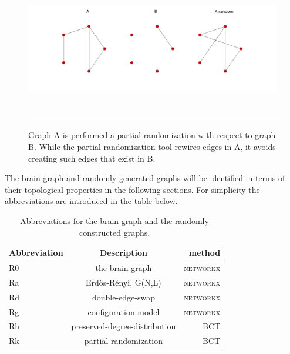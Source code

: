 \begin{figure}[htbp]
  \centering
	\includegraphics[width=\textwidth, height=55mm]{Figures/p1.png}  
    \rule{35em}{0.5pt}
    \caption[Partial Randomization Example]{Graph A is performed a partial randomization with respect to graph B. While the partial randomization tool rewires edges in A, it avoids creating such edges that exist in B.}
  \label{fig:Partial Randomization Example}
\end{figure}

The brain graph and randomly generated graphs will be identified in terms of their topological properties in the following sections. For simplicity the abbreviations are introduced in the table below. 

\begin{table}[h]
\begin{center}
\caption[Abbreviations]{Abbreviations for the brain graph and the randomly constructed graphs. }
\begin{tabular}{ l | c | r }
  Abbreviation & Description & method \\
  \hline  \hline                     
  R0 & the brain graph						  & \textsc{networkx} \\ \hline
  Ra & Erd\H{o}s-R\'{e}nyi, G(N,L)            & \textsc{networkx} \\ \hline
  Rd & double-edge-swap            			  & \textsc{networkx} \\ \hline
  Rg & configuration model       			  & \textsc{networkx} \\ \hline
  Rh & preserved-degree-distribution		  & \textsc{BCT} 	 \\ \hline
  Rk & partial randomization            	  & \textsc{BCT} 	 \\ \hline  
  \hline  
\end{tabular}
\label{table:Abbreviations}
\end{center}
\end{table}	

